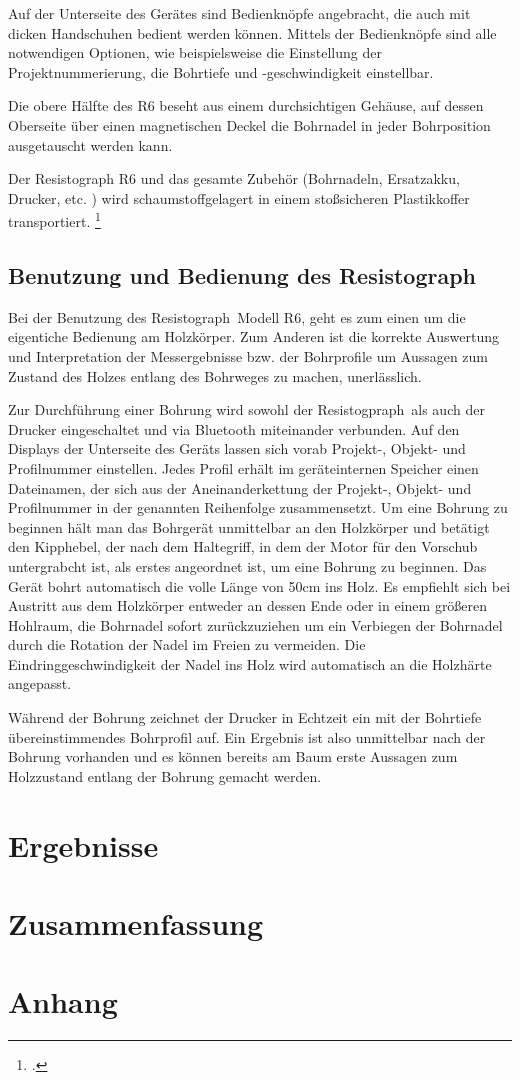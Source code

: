 \documentclass[a4paper, halfparskip]{article}
\def\SymbReg{\textsuperscript{\textregistered}}
\begin{document}
Auf der Unterseite des Gerätes sind Bedienknöpfe angebracht, die auch mit
dicken Handschuhen bedient werden können. Mittels der Bedienknöpfe sind alle
notwendigen Optionen, wie beispielsweise die Einstellung der
Projektnummerierung, die Bohrtiefe und -geschwindigkeit einstellbar.

Die obere Hälfte des R6 beseht aus einem durchsichtigen Gehäuse, auf dessen
Oberseite über einen magnetischen Deckel die Bohrnadel in jeder
Bohrposition ausgetauscht werden kann.

Der Resistograph R6 und das gesamte Zubehör (Bohrnadeln, Ersatzakku, Drucker,
etc. ) wird schaumstoffgelagert in einem stoßsicheren Plastikkoffer
transportiert. \footcite{rinn:anleitung_resi}

\subsection{Benutzung und Bedienung des Resistograph\SymbReg}
Bei der Benutzung des Resistograph\SymbReg\ Modell R6, geht es zum einen um
die eigentiche Bedienung am Holzkörper. Zum Anderen ist die korrekte 
Auswertung und Interpretation der Messergebnisse bzw. der Bohrprofile um
Aussagen zum Zustand des Holzes entlang des Bohrweges zu machen, unerlässlich.

Zur Durchführung einer Bohrung wird sowohl der Resistogpraph\SymbReg\ als auch
der Drucker eingeschaltet und via Bluetooth miteinander verbunden. Auf den
Displays der Unterseite des Geräts lassen sich vorab Projekt-, Objekt- und
Profilnummer einstellen. Jedes Profil erhält im geräteinternen Speicher einen
Dateinamen, der sich aus der Aneinanderkettung der Projekt-, Objekt- und
Profilnummer in der genannten Reihenfolge zusammensetzt. Um eine Bohrung zu
beginnen hält man das Bohrgerät unmittelbar an den Holzkörper und betätigt
den Kipphebel, der nach dem Haltegriff, in dem der Motor für den Vorschub
untergrabcht ist, als erstes angeordnet ist, um eine Bohrung zu beginnen. Das
Gerät bohrt automatisch die volle Länge von 50cm ins Holz. Es empfiehlt sich
bei Austritt aus dem Holzkörper entweder an dessen Ende oder in einem größeren
Hohlraum, die Bohrnadel sofort zurückzuziehen um ein Verbiegen der Bohrnadel
durch die Rotation der Nadel im Freien zu vermeiden.  Die
Eindringgeschwindigkeit der Nadel ins Holz wird automatisch an die Holzhärte
angepasst.

Während der Bohrung zeichnet der Drucker in Echtzeit ein mit der Bohrtiefe
übereinstimmendes Bohrprofil auf. Ein Ergebnis ist also unmittelbar nach der
Bohrung vorhanden und es können bereits am Baum erste Aussagen zum Holzzustand
entlang der Bohrung gemacht werden.

\section{Ergebnisse}
\section{Zusammenfassung}
\section{Anhang}



\end{document}
